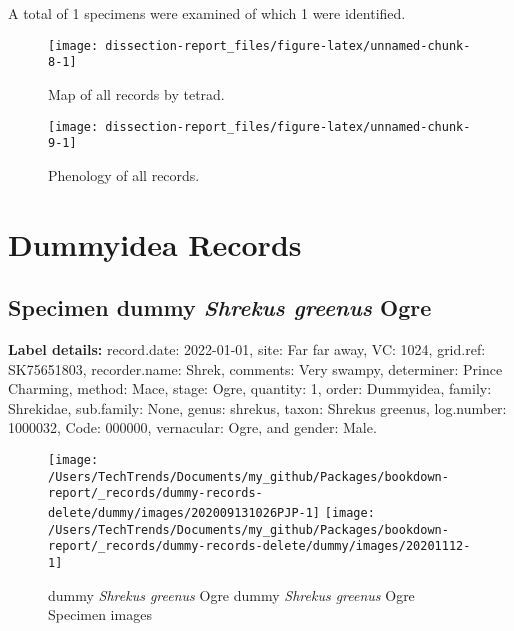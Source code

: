 \documentclass{article}
\begin{document}
A total of 1 specimens were examined of which 1 were identified.

\begin{figure}[p]

{\centering \texttt{[image: dissection-report\_files/figure-latex/unnamed-chunk-8-1]} 

}

\caption{Map of all records by tetrad.}\label{fig:unnamed-chunk-8}
\end{figure}

\begin{figure}[p]

{\centering \texttt{[image: dissection-report\_files/figure-latex/unnamed-chunk-9-1]} 

}

\caption{Phenology of all records.}\label{fig:unnamed-chunk-9}
\end{figure}

\newpage

\hypertarget{dummyidea-records}{%
\section{Dummyidea Records}\label{dummyidea-records}}

\hypertarget{specimen-dummy-ogre}{%
\subsection*{\texorpdfstring{Specimen dummy \emph{ Shrekus greenus } Ogre}{Specimen dummy  Ogre}}\label{specimen-dummy-ogre}}

\textbf{Label details:}
record.date: 2022-01-01, site: Far far away, VC: 1024, grid.ref: SK75651803, recorder.name: Shrek, comments: Very swampy, determiner: Prince Charming, method: Mace, stage: Ogre, quantity: 1, order: Dummyidea, family: Shrekidae, sub.family: None, genus: shrekus, taxon: Shrekus greenus, log.number: 1000032, Code: 000000, vernacular: Ogre, and gender: Male.

\begin{figure}[p]

{\centering \texttt{[image: /Users/TechTrends/Documents/my\_github/Packages/bookdown-report/\_records/dummy-records-delete/dummy/images/202009131026PJP-1]} \texttt{[image: /Users/TechTrends/Documents/my\_github/Packages/bookdown-report/\_records/dummy-records-delete/dummy/images/20201112-1]} 

}

\caption{dummy  \emph{ Shrekus greenus } Ogre dummy  \emph{ Shrekus greenus } Ogre Specimen images}\label{fig:unnamed-chunk-16}
\end{figure}
\end{document}
